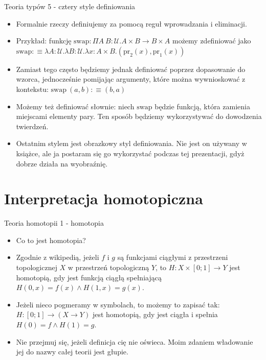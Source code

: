 \documentclass{beamer}
\newcommand{\defn}{:\equiv}
\newcommand{\U}{\mathcal{U}}
\newcommand{\prl}{\text{pr}_1}
\newcommand{\prr}{\text{pr}_2}
\begin{document}
\begin{frame}{Teoria typów 5 - cztery style definiowania}
\begin{itemize}
	\item Formalnie rzeczy definiujemy za pomocą reguł wprowadzania i eliminacji.
	\item Przykład: funkcję $\text{swap} : \Pi A\ B : \U. A \times B \to B \times A$ możemy zdefiniować jako $\text{swap} \defn \lambda A : \U.\lambda B : \U.\lambda x : A \times B. (\prr(x), \prl(x))$
	\item Zamiast tego często będziemy jednak definiować poprzez dopasowanie do wzorca, jednocześnie pomijając argumenty, które można wywnioskować z kontekstu: $\text{swap}\ (a, b) \defn (b, a)$
	\item Możemy też definiować słownie: niech $\text{swap}$ będzie funkcją, która zamienia miejscami elementy pary. Ten sposób będziemy wykorzystywać do dowodzenia twierdzeń.
	\item Ostatnim stylem jest obrazkowy styl definiowania. Nie jest on używany w książce, ale ja postaram się go wykorzystać podczas tej prezentacji, gdyż dobrze działa na wyobraźnię.
\end{itemize}
\end{frame}

\section{Interpretacja homotopiczna}

\begin{frame}{Teoria homotopii 1 - homotopia}
\begin{itemize}
	\item Co to jest homotopia?
	\item Zgodnie z wikipedią, jeżeli $f$ i $g$ są funkcjami ciągłymi z przestrzeni topologicznej $X$ w przestrzeń topologiczną $Y$, to $H : X \times [0; 1] \to Y$ jest homotopią, gdy jest funkcją ciągłą spełniającą $H(0, x) = f(x) \land H(1, x) = g(x)$.
	\item Jeżeli nieco pogmeramy w symbolach, to możemy to zapisać tak: $H: [0; 1] \to (X \to Y)$ jest homotopią, gdy jest ciągła i spełnia $H(0) = f \land H(1) = g$.
	\item Nie przejmuj się, jeżeli definicja cię nie oświeca. Moim zdaniem władowanie jej do nazwy całej teorii jest głupie.
\end{itemize}
\end{frame}
\end{document}
